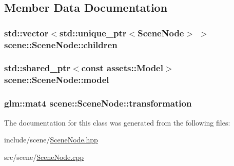 \subsection{Member Data Documentation}
\hypertarget{classscene_1_1SceneNode_a66b33dd812436689d350f688121d7c0c}{
\subsubsection[{children}]{\setlength{\rightskip}{0pt plus 5cm}std\-::vector$<$std\-::unique\-\_\-ptr$<${\bf Scene\-Node}$>$ $>$ scene\-::\-Scene\-Node\-::children}}\label{classscene_1_1SceneNode_a66b33dd812436689d350f688121d7c0c}
\hypertarget{classscene_1_1SceneNode_afe99ae8f79ad4b4fe5ff866227b5922f}{
\subsubsection[{model}]{\setlength{\rightskip}{0pt plus 5cm}std\-::shared\-\_\-ptr$<$const {\bf assets\-::\-Model}$>$ scene\-::\-Scene\-Node\-::model}}\label{classscene_1_1SceneNode_afe99ae8f79ad4b4fe5ff866227b5922f}
\hypertarget{classscene_1_1SceneNode_af5a0e6b3540fd9b070f6797ed14f079d}{
\subsubsection[{transformation}]{\setlength{\rightskip}{0pt plus 5cm}glm\-::mat4 scene\-::\-Scene\-Node\-::transformation}}\label{classscene_1_1SceneNode_af5a0e6b3540fd9b070f6797ed14f079d}


The documentation for this class was generated from the following files\-:\begin{DoxyCompactItemize}
\item 
include/scene/\hyperlink{SceneNode_8hpp}{Scene\-Node.\-hpp}\item 
src/scene/\hyperlink{SceneNode_8cpp}{Scene\-Node.\-cpp}\end{DoxyCompactItemize}
